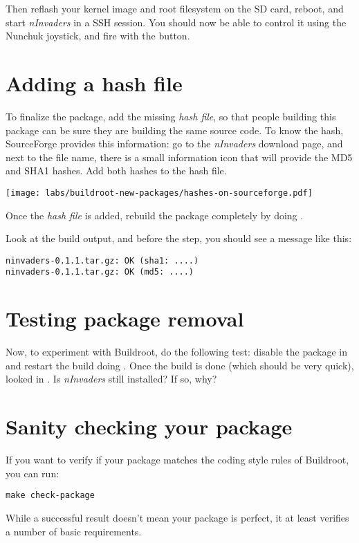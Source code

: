 Then reflash your kernel image and root filesystem on the SD card,
reboot, and start {\em nInvaders} in a SSH session. You should now be
able to control it using the Nunchuk joystick, and fire with the
 button.

\section{Adding a hash file}

To finalize the package, add the missing {\em hash file}, so that
people building this package can be sure they are building the same
source code. To know the hash, SourceForge provides this information:
go to the {\em nInvaders} download page, and next to the file name,
there is a small information icon that will provide the MD5 and SHA1
hashes. Add both hashes to the hash file.

\begin{center}
\texttt{[image: labs/buildroot-new-packages/hashes-on-sourceforge.pdf]}
\end{center}

Once the {\em hash file} is added, rebuild the package completely by
doing .

Look at the build output, and before the  step, you should see a message like this:

\begin{verbatim}
ninvaders-0.1.1.tar.gz: OK (sha1: ....)
ninvaders-0.1.1.tar.gz: OK (md5: ....)
\end{verbatim}

\section{Testing package removal}

Now, to experiment with Buildroot, do the following test: disable the
 package in  and restart the build
doing . Once the build is done (which should be very
quick), looked in . Is {\em nInvaders} still
installed? If so, why?

\section{Sanity checking your package}

If you want to verify if your package matches the coding style rules
of Buildroot, you can run:

\begin{verbatim}
make check-package
\end{verbatim}

While a successful result doesn't mean your package is perfect, it at
least verifies a number of basic requirements.
